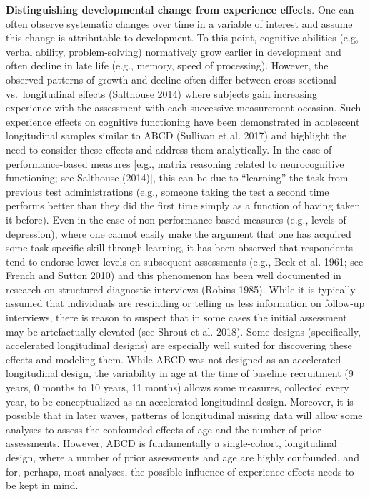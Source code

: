 \documentclass[
  letterpaper,
  DIV=11,
  numbers=noendperiod]{scrartcl}
\begin{document}
\textbf{Distinguishing developmental change from experience effects}.
One can often observe systematic changes over time in a variable of
interest and assume this change is attributable to development. To this
point, cognitive abilities (e.g, verbal ability, problem-solving)
normatively grow earlier in development and often decline in late life
(e.g., memory, speed of processing). However, the observed patterns of
growth and decline often differ between cross-sectional vs.~longitudinal
effects (Salthouse 2014) where subjects gain increasing experience with
the assessment with each successive measurement occasion. Such
experience effects on cognitive functioning have been demonstrated in
adolescent longitudinal samples similar to ABCD (Sullivan et al. 2017)
and highlight the need to consider these effects and address them
analytically. In the case of performance-based measures {[}e.g., matrix
reasoning related to neurocognitive functioning; see Salthouse
(2014){]}, this can be due to ``learning'' the task from previous test
administrations (e.g., someone taking the test a second time performs
better than they did the first time simply as a function of having taken
it before). Even in the case of non-performance-based measures (e.g.,
levels of depression), where one cannot easily make the argument that
one has acquired some task-specific skill through learning, it has been
observed that respondents tend to endorse lower levels on subsequent
assessments (e.g., Beck et al. 1961; see French and Sutton 2010) and
this phenomenon has been well documented in research on structured
diagnostic interviews (Robins 1985). While it is typically assumed that
individuals are rescinding or telling us less information on follow-up
interviews, there is reason to suspect that in some cases the initial
assessment may be artefactually elevated (see Shrout et al. 2018). Some
designs (specifically, accelerated longitudinal designs) are especially
well suited for discovering these effects and modeling them. While ABCD
was not designed as an accelerated longitudinal design, the variability
in age at the time of baseline recruitment (9 years, 0 months to 10
years, 11 months) allows some measures, collected every year, to be
conceptualized as an accelerated longitudinal design. Moreover, it is
possible that in later waves, patterns of longitudinal missing data will
allow some analyses to assess the confounded effects of age and the
number of prior assessments. However, ABCD is fundamentally a
single-cohort, longitudinal design, where a number of prior assessments
and age are highly confounded, and for, perhaps, most analyses, the
possible influence of experience effects needs to be kept in mind.
\end{document}
